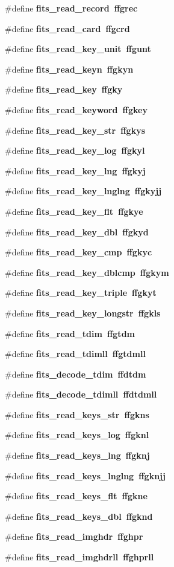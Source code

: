 \begin{CompactItemize}
\item 
\#define \bf{fits\_\-read\_\-record}~ffgrec
\item 
\#define \bf{fits\_\-read\_\-card}~ffgcrd
\item 
\#define \bf{fits\_\-read\_\-key\_\-unit}~ffgunt
\item 
\#define \bf{fits\_\-read\_\-keyn}~ffgkyn
\item 
\#define \bf{fits\_\-read\_\-key}~ffgky
\item 
\#define \bf{fits\_\-read\_\-keyword}~ffgkey
\item 
\#define \bf{fits\_\-read\_\-key\_\-str}~ffgkys
\item 
\#define \bf{fits\_\-read\_\-key\_\-log}~ffgkyl
\item 
\#define \bf{fits\_\-read\_\-key\_\-lng}~ffgkyj
\item 
\#define \bf{fits\_\-read\_\-key\_\-lnglng}~ffgkyjj
\item 
\#define \bf{fits\_\-read\_\-key\_\-flt}~ffgkye
\item 
\#define \bf{fits\_\-read\_\-key\_\-dbl}~ffgkyd
\item 
\#define \bf{fits\_\-read\_\-key\_\-cmp}~ffgkyc
\item 
\#define \bf{fits\_\-read\_\-key\_\-dblcmp}~ffgkym
\item 
\#define \bf{fits\_\-read\_\-key\_\-triple}~ffgkyt
\item 
\#define \bf{fits\_\-read\_\-key\_\-longstr}~ffgkls
\item 
\#define \bf{fits\_\-read\_\-tdim}~ffgtdm
\item 
\#define \bf{fits\_\-read\_\-tdimll}~ffgtdmll
\item 
\#define \bf{fits\_\-decode\_\-tdim}~ffdtdm
\item 
\#define \bf{fits\_\-decode\_\-tdimll}~ffdtdmll
\item 
\#define \bf{fits\_\-read\_\-keys\_\-str}~ffgkns
\item 
\#define \bf{fits\_\-read\_\-keys\_\-log}~ffgknl
\item 
\#define \bf{fits\_\-read\_\-keys\_\-lng}~ffgknj
\item 
\#define \bf{fits\_\-read\_\-keys\_\-lnglng}~ffgknjj
\item 
\#define \bf{fits\_\-read\_\-keys\_\-flt}~ffgkne
\item 
\#define \bf{fits\_\-read\_\-keys\_\-dbl}~ffgknd
\item 
\#define \bf{fits\_\-read\_\-imghdr}~ffghpr
\item 
\#define \bf{fits\_\-read\_\-imghdrll}~ffghprll

\end{CompactItemize}
